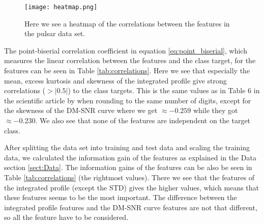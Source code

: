 \documentclass[12pt,a4paper,english]{article}
\begin{document}
\begin{figure}[htbp!]
	\centering\texttt{[image: heatmap.png]}
	\caption{Here we see a heatmap of the correlations between the features in the pulsar data set.\label{fig:heatmap}}
\end{figure} 

The point-biserial correlation coefficient in equation \ref{eq:point_biserial}, which measures the linear correlation between the features and the class target, for the features can be seen in Table \ref{tab:correlations}. Here we see that especially the mean, excess kurtosis and skewness of the integrated profile give strong correlations ($>|0.5|$) to the class targets. This is the same values as in Table 6 in the scientific article by \citet{pulsar_art} when rounding to the same number of digits, except for the skewness of the DM-SNR curve where we get $\approx-0.259$ while they got $\approx-0.230$. We also see that none of the features are independent on the target class.

After splitting the data set into training and test data and scaling the training data, we calculated the information gain of the features as explained in the Data section \ref{sect:Data}. The information gains of the features can be also be seen in Table \ref{tab:correlations} (the rightmost values). There we see that the features of the integrated profile (except the STD) gives the higher values, which means that these features seems to be the most important. The difference between the integrated profile features and the DM-SNR curve features are not that different, so all the feature have to be considered.
\end{document}
